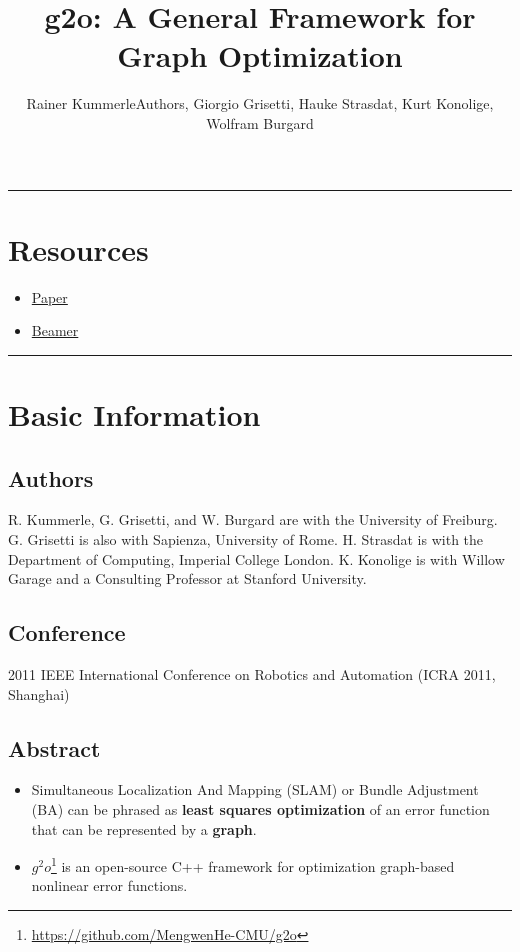 \documentclass[letterpaper,10pt]{article}
\title{\textbf{g2o: A General Framework for Graph Optimization}}
\author{Rainer KummerleAuthors, Giorgio Grisetti, Hauke Strasdat, Kurt Konolige, Wolfram Burgard}
\begin{document}
	
\maketitle

\tableofcontents

\begin{center}\rule{\textwidth}{1pt}\end{center}
\section{Resources}

\begin{itemize}
	\item \href{./paper.pdf}{Paper}
	\item \href{./beamer.pdf}{Beamer}
\end{itemize}

\begin{center}\rule{\textwidth}{1pt}\end{center}
\section{Basic Information}

\subsection{Authors}
R. Kummerle, G. Grisetti, and W. Burgard are with the University
of Freiburg. G. Grisetti is also with Sapienza, University of Rome. H. Strasdat is with the Department of Computing, Imperial College London. K. Konolige is with Willow Garage and a Consulting Professor at Stanford University.

\subsection{Conference}

2011 IEEE International Conference on Robotics and Automation (ICRA 2011, Shanghai)

\subsection{Abstract}
\begin{itemize}
	\item Simultaneous Localization And Mapping (SLAM) or Bundle Adjustment (BA) can be phrased as \textbf{least squares optimization} of an error function that can be represented by a \textbf{graph}.
	\item $g^2o$\footnote{\url{https://github.com/MengwenHe-CMU/g2o}} is an open-source C++ framework for optimization graph-based nonlinear error functions.
\end{itemize}
\end{document}
